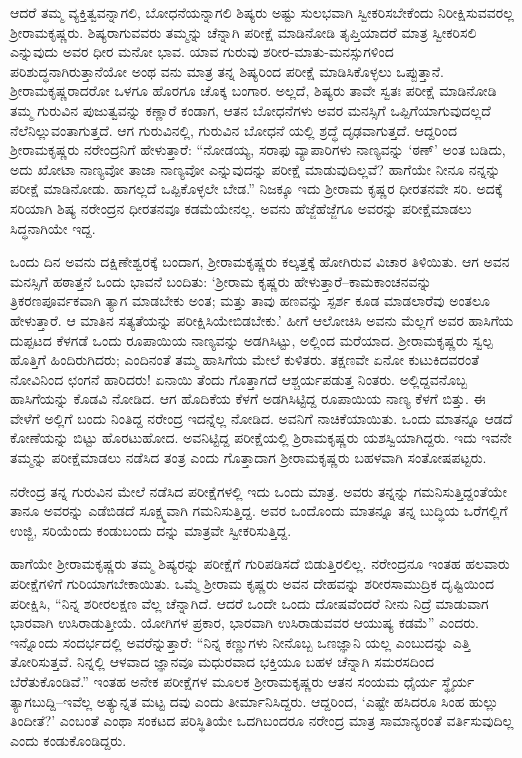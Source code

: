 ಆದರೆ ತಮ್ಮ ವ್ಯಕ್ತಿತ್ವವನ್ನಾಗಲಿ, ಬೋಧನೆಯನ್ನಾಗಲಿ ಶಿಷ್ಯರು ಅಷ್ಟು ಸುಲಭವಾಗಿ ಸ್ವೀಕರಿಸಬೇಕೆಂದು ನಿರೀಕ್ಷಿಸುವವರಲ್ಲ ಶ್ರೀರಾಮಕೃಷ್ಣರು. ಶಿಷ್ಯರಾಗುವವರು ತಮ್ಮನ್ನು ಚೆನ್ನಾಗಿ ಪರೀಕ್ಷೆ ಮಾಡಿನೋಡಿ ತೃಪ್ತಿಯಾದರೆ ಮಾತ್ರ ಸ್ವೀಕರಿಸಲಿ ಎನ್ನುವುದು ಅವರ ಧೀರ ಮನೋ ಭಾವ. ಯಾವ ಗುರುವು ಶರೀರ-ಮಾತು-ಮನಸ್ಸುಗಳಿಂದ ಪರಿಶುದ್ಧನಾಗಿರುತ್ತಾನೆಯೋ ಅಂಥ ವನು ಮಾತ್ರ ತನ್ನ ಶಿಷ್ಯರಿಂದ ಪರೀಕ್ಷೆ ಮಾಡಿಸಿಕೊಳ್ಳಲು ಒಪ್ಪುತ್ತಾನೆ. ಶ್ರೀರಾಮಕೃಷ್ಣರಾದರೋ ಒಳಗೂ ಹೊರಗೂ ಚೊಕ್ಕ ಬಂಗಾರ. ಅಲ್ಲದೆ, ಶಿಷ್ಯರು ತಾವೇ ಸ್ವತಃ ಪರೀಕ್ಷೆ ಮಾಡಿನೋಡಿ ತಮ್ಮ ಗುರುವಿನ ಪುಜುತ್ವವನ್ನು ಕಣ್ಣಾರೆ ಕಂಡಾಗ, ಆತನ ಬೋಧನೆಗಳು ಅವರ ಮನಸ್ಸಿಗೆ ಒಪ್ಪಿಗೆಯಾಗುವುದಲ್ಲದೆ ನೆಲೆನಿಲ್ಲುವಂತಾಗುತ್ತದೆ. ಆಗ ಗುರುವಿನಲ್ಲಿ, ಗುರುವಿನ ಬೋಧನೆ ಯಲ್ಲಿ ಶ್ರದ್ಧೆ ದೃಢವಾಗುತ್ತದೆ. ಆದ್ದರಿಂದ ಶ್ರೀರಾಮಕೃಷ್ಣರು ನರೇಂದ್ರನಿಗೆ ಹೇಳುತ್ತಾರೆ: “ನೋಡಯ್ಯ, ಸರಾಫು ವ್ಯಾಪಾರಿಗಳು ನಾಣ್ಯವನ್ನು ‘ಠಣ್’ ಅಂತ ಬಡಿದು, ಅದು ಖೋಟಾ ನಾಣ್ಯವೋ ತಾಜಾ ನಾಣ್ಯವೋ ಎನ್ನುವುದನ್ನು ಪರೀಕ್ಷೆ ಮಾಡುವುದಿಲ್ಲವೆ? ಹಾಗೆಯೇ ನೀನೂ ನನ್ನನ್ನು ಪರೀಕ್ಷೆ ಮಾಡಿನೋಡು. ಹಾಗಲ್ಲದೆ ಒಪ್ಪಿಕೊಳ್ಳಲೇ ಬೇಡ.” ನಿಜಕ್ಕೂ ಇದು ಶ್ರೀರಾಮ ಕೃಷ್ಣರ ಧೀರತನವೇ ಸರಿ. ಅದಕ್ಕೆ ಸರಿಯಾಗಿ ಶಿಷ್ಯ ನರೇಂದ್ರನ ಧೀರತನವೂ ಕಡಮೆಯೇನಲ್ಲ. ಅವನು ಹೆಜ್ಜೆಹೆಜ್ಜೆಗೂ ಅವರನ್ನು ಪರೀಕ್ಷೆಮಾಡಲು ಸಿದ್ಧನಾಗಿಯೇ ಇದ್ದ.

ಒಂದು ದಿನ ಅವನು ದಕ್ಷಿಣೇಶ್ವರಕ್ಕೆ ಬಂದಾಗ, ಶ್ರೀರಾಮಕೃಷ್ಣರು ಕಲ್ಕತ್ತಕ್ಕೆ ಹೋಗಿರುವ ವಿಚಾರ ತಿಳಿಯಿತು. ಆಗ ಅವನ ಮನಸ್ಸಿಗೆ ಹಠಾತ್ತನೆ ಒಂದು ಭಾವನೆ ಬಂದಿತು: ‘ಶ್ರೀರಾಮ ಕೃಷ್ಣರು ಹೇಳುತ್ತಾರೆ–ಕಾಮಕಾಂಚನವನ್ನು ತ್ರಿಕರಣಪೂರ್ವಕವಾಗಿ ತ್ಯಾಗ ಮಾಡಬೇಕು ಅಂತ; ಮತ್ತು ತಾವು ಹಣವನ್ನು ಸ್ಪರ್ಶ ಕೂಡ ಮಾಡಲಾರೆವು ಅಂತಲೂ ಹೇಳುತ್ತಾರೆ. ಆ ಮಾತಿನ ಸತ್ಯತೆಯನ್ನು ಪರೀಕ್ಷಿಸಿಯೇಬಿಡಬೇಕು.’ ಹೀಗೆ ಆಲೋಚಿಸಿ ಅವನು ಮೆಲ್ಲಗೆ ಅವರ ಹಾಸಿಗೆಯ ದುಪ್ಪಟದ ಕೆಳಗಡೆ ಒಂದು ರೂಪಾಯಿಯ ನಾಣ್ಯವನ್ನು ಅಡಗಿಸಿಟ್ಟು, ಅಲ್ಲಿಂದ ಮರೆಯಾದ. ಶ್ರೀರಾಮಕೃಷ್ಣರು ಸ್ವಲ್ಪ ಹೊತ್ತಿಗೆ ಹಿಂದಿರುಗಿದರು; ಎಂದಿನಂತೆ ತಮ್ಮ ಹಾಸಿಗೆಯ ಮೇಲೆ ಕುಳಿತರು. ತಕ್ಷಣವೇ ಏನೋ ಕುಟುಕಿದವರಂತೆ ನೋವಿನಿಂದ ಛಂಗನೆ ಹಾರಿದರು! ಏನಾಯಿ ತೆಂದು ಗೊತ್ತಾಗದೆ ಆಶ್ಚರ್ಯಪಡುತ್ತ ನಿಂತರು. ಅಲ್ಲಿದ್ದವನೊಬ್ಬ ಹಾಸಿಗೆಯನ್ನು ಕೊಡವಿ ನೋಡಿದ. ಆಗ ಹೊದಿಕೆಯ ಕೆಳಗೆ ಅಡಗಿಸಿಟ್ಟಿದ್ದ ರೂಪಾಯಿಯ ನಾಣ್ಯ ಕೆಳಗೆ ಬಿತ್ತು. ಈ ವೇಳೆಗೆ ಅಲ್ಲಿಗೆ ಬಂದು ನಿಂತಿದ್ದ ನರೇಂದ್ರ ಇದನ್ನೆಲ್ಲ ನೋಡಿದ. ಅವನಿಗೆ ನಾಚಿಕೆಯಾಯಿತು. ಒಂದು ಮಾತನ್ನೂ ಆಡದೆ ಕೋಣೆಯನ್ನು ಬಿಟ್ಟು ಹೊರಟುಹೋದ. ಅವನಿಟ್ಟಿದ್ದ ಪರೀಕ್ಷೆಯಲ್ಲಿ ಶ್ರಿರಾಮಕೃಷ್ಣರು ಯಶಸ್ವಿಯಾಗಿದ್ದರು. ಇದು ಇವನೇ ತಮ್ಮನ್ನು ಪರೀಕ್ಷೆಮಾಡಲು ನಡೆಸಿದ ತಂತ್ರ ಎಂದು ಗೊತ್ತಾದಾಗ ಶ್ರೀರಾಮಕೃಷ್ಣರು ಬಹಳವಾಗಿ ಸಂತೋಷಪಟ್ಟರು.

ನರೇಂದ್ರ ತನ್ನ ಗುರುವಿನ ಮೇಲೆ ನಡೆಸಿದ ಪರೀಕ್ಷೆಗಳಲ್ಲಿ ಇದು ಒಂದು ಮಾತ್ರ. ಅವರು ತನ್ನನ್ನು ಗಮನಿಸುತ್ತಿದ್ದಂತೆಯೇ ತಾನೂ ಅವರನ್ನು ಎಡೆಬಿಡದೆ ಸೂಕ್ಷ್ಮವಾಗಿ ಗಮನಿಸುತ್ತಿದ್ದ. ಅವರ ಒಂದೊಂದು ಮಾತನ್ನೂ ತನ್ನ ಬುದ್ಧಿಯ ಒರೆಗಲ್ಲಿಗೆ ಉಜ್ಜಿ, ಸರಿಯೆಂದು ಕಂಡುಬಂದು ದನ್ನು ಮಾತ್ರವೇ ಸ್ವೀಕರಿಸುತ್ತಿದ್ದ.

ಹಾಗೆಯೇ ಶ್ರೀರಾಮಕೃಷ್ಣರು ತಮ್ಮ ಶಿಷ್ಯರನ್ನು ಪರೀಕ್ಷೆಗೆ ಗುರಿಪಡಿಸದೆ ಬಿಡುತ್ತಿರಲಿಲ್ಲ. ನರೇಂದ್ರನೂ ಇಂತಹ ಹಲವಾರು ಪರೀಕ್ಷೆಗಳಿಗೆ ಗುರಿಯಾಗಬೇಕಾಯಿತು. ಒಮ್ಮೆ ಶ್ರೀರಾಮ ಕೃಷ್ಣರು ಅವನ ದೇಹವನ್ನು ಶರೀರಸಾಮುದ್ರಿಕ ದೃಷ್ಟಿಯಿಂದ ಪರೀಕ್ಷಿಸಿ, “ನಿನ್ನ ಶರೀರಲಕ್ಷಣ ವೆಲ್ಲ ಚೆನ್ನಾಗಿದೆ. ಆದರೆ ಒಂದೇ ಒಂದು ದೋಷವೆಂದರೆ ನೀನು ನಿದ್ರೆ ಮಾಡುವಾಗ ಭಾರವಾಗಿ ಉಸಿರಾಡುತ್ತೀಯೆ. ಯೋಗಿಗಳ ಪ್ರಕಾರ, ಭಾರವಾಗಿ ಉಸಿರಾಡುವವರ ಆಯುಷ್ಯ ಕಡಮೆ” ಎಂದರು. ಇನ್ನೊಂದು ಸಂದರ್ಭದಲ್ಲಿ ಅವರೆನ್ನುತ್ತಾರೆ: “ನಿನ್ನ ಕಣ್ಣುಗಳು ನೀನೊಬ್ಬ ಒಣಜ್ಞಾನಿ ಯಲ್ಲ ಎಂಬುದನ್ನು ಎತ್ತಿ ತೋರಿಸುತ್ತವೆ. ನಿನ್ನಲ್ಲಿ ಆಳವಾದ ಜ್ಞಾನವೂ ಮಧುರವಾದ ಭಕ್ತಿಯೂ ಬಹಳ ಚೆನ್ನಾಗಿ ಸಮರಸದಿಂದ ಬೆರೆತುಕೊಂಡಿವೆ.” ಇಂತಹ ಅನೇಕ ಪರೀಕ್ಷೆಗಳ ಮೂಲಕ ಶ್ರೀರಾಮಕೃಷ್ಣರು ಆತನ ಸಂಯಮ ಧೈರ್ಯ ಸ್ಥೈರ್ಯ ತ್ಯಾಗಬುದ್ದಿ–ಇವೆಲ್ಲ ಅತ್ಯುನ್ನತ ಮಟ್ಟ ದವು ಎಂದು ತೀರ್ಮಾನಿಸಿದ್ದರು. ಆದ್ದರಿಂದ, ‘ಎಷ್ಟೇ ಹಸಿದರೂ ಸಿಂಹ ಹುಲ್ಲು ತಿಂದೀತೆ?’ ಎಂಬಂತೆ ಎಂಥಾ ಸಂಕಟದ ಪರಿಸ್ಥಿತಿಯೇ ಒದಗಿಬಂದರೂ ನರೇಂದ್ರ ಮಾತ್ರ ಸಾಮಾನ್ಯರಂತೆ ವರ್ತಿಸುವುದಿಲ್ಲ ಎಂದು ಕಂಡುಕೊಂಡಿದ್ದರು.

